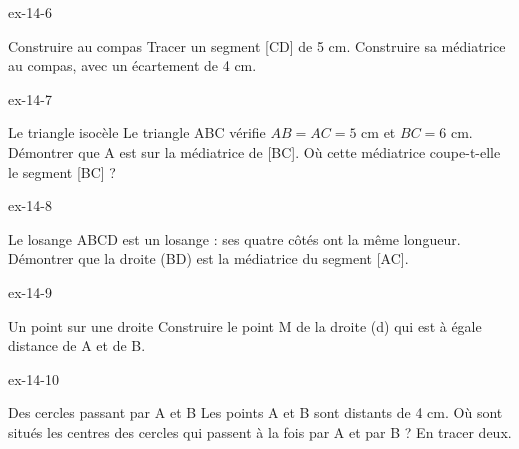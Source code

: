 \begin{blocLivre}{ex-14-6}\begin{exercice}[2]{Construire au compas}
Tracer un segment [CD] de 5 cm. Construire sa médiatrice au compas, avec un écartement de 4 cm.
\label{fig-ex-14-6}
\end{exercice}\end{blocLivre}
\begin{blocLivre}{ex-14-7}\begin{exercice}[2]{Le triangle isocèle}
Le triangle ABC vérifie $AB=AC=5$ cm et $BC=6$ cm. Démontrer que A est sur la médiatrice de [BC]. Où cette médiatrice coupe-t-elle le segment [BC] ?
\label{fig-ex-14-7}
\end{exercice}\end{blocLivre}
\begin{blocLivre}{ex-14-8}\begin{exercice}[2]{Le losange}
ABCD est un losange : ses quatre côtés ont la même longueur. Démontrer que la droite (BD) est la médiatrice du segment [AC].
\label{fig-ex-14-8}
\end{exercice}\end{blocLivre}
\begin{blocLivre}{ex-14-9}\begin{exercice}[2]{Un point sur une droite}
Construire le point M de la droite (d) qui est à égale distance de A et de B.
\label{fig-ex-14-9}
\end{exercice}\end{blocLivre}
\begin{blocLivre}{ex-14-10}\begin{exercice}[2]{Des cercles passant par A et B}
Les points A et B sont distants de 4 cm. Où sont situés les centres des cercles qui passent à la fois par A et par B ? En tracer deux.
\label{fig-ex-14-10}
\end{exercice}\end{blocLivre}


